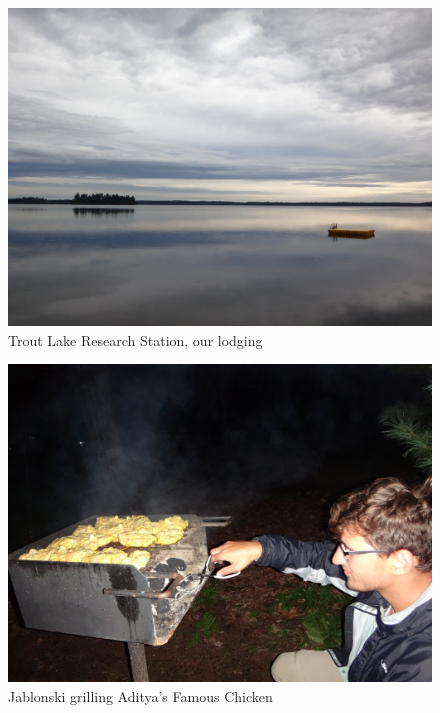 \documentclass{article}
\begin{document}
\begin{figure}[htbp]
\centering
\includegraphics[width=.9\linewidth]{blog_imgs/FieldWorkUpNorth_Sep8-10/DSC01830.jpg}
\caption{Trout Lake Research Station, our lodging}
\end{figure}

\begin{figure}[htbp]
\centering
\includegraphics[width=.9\linewidth]{blog_imgs/FieldWorkUpNorth_Sep8-10/DSC01827.jpg}
\caption{Jablonski grilling Aditya's Famous Chicken}
\end{figure}
\end{document}
